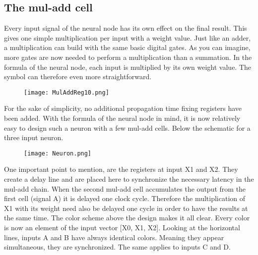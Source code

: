 \subsection{The mul-add cell}
\label{ssec:The-mul-add-cell} 
Every input signal of the neural node has its own effect on
the final result. This gives one simple multiplication per input with a weight
value. 
Just like an adder, a multiplication can build with the same basic digital
gates. As you can imagine, more gates are now needed to perform a multiplication
than a summation. In the formula of the neural node, each input is multiplied by
its own weight value. The symbol can therefore even more straightforward.
%
\begin{figure}[htb]
	\centering
	\texttt{[image: MulAddReg10.png]}
	\label{fig:mul-add-register}
\end{figure}
%
%
For the sake of simplicity, no additional propagation time fixing registers have
been added. With the formula of the neural node in mind, it is now relatively
easy to design such a neuron with a few mul-add cells. Below the schematic for a
three input neuron.
%
\begin{figure}[htb]
	\centering
	\texttt{[image: Neuron.png]}
	\label{fig:3-input-neuron}
\end{figure}
%
%  
One important point to mention, are the registers at input X1 and X2. They
create a delay line and are placed here to synchronize the necessary latency in
the mul-add chain. When the second mul-add cell accumulates the output from the
first cell (signal A) it is delayed one clock cycle. Therefore the
multiplication of X1 with its weight need also be delayed one cycle in order to
have the results at the same time. The color scheme above the design makes it
all clear. Every color is now an element of the input vector [X0, X1, X2].
Looking at the horizontal lines, inputs A and B have always identical colors.
Meaning they appear simultaneous, they are synchronized. The same applies to
inputs C and D. 
%
